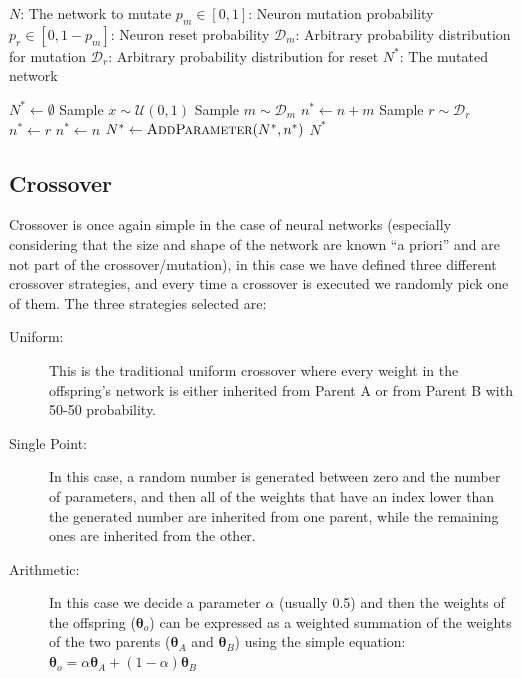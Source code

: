\begin{algorithm}[ht]
\caption{Mutation of neural network}
\begin{algorithmic}[1]
    \Require $N$: The network to mutate
    \Require $p_m \in [0, 1]$: Neuron mutation probability
    \Require $p_r \in [0, 1 - p_m]$: Neuron reset probability
    \Require $\mathcal{D}_m$: Arbitrary probability distribution for mutation 
    \Require $\mathcal{D}_r$: Arbitrary probability distribution for reset
    \Ensure $N^*$: The mutated network

        \State $N^* \gets \emptyset$ 
         
            \State Sample $x \sim \mathcal{U}(0,1)$
             
                \State Sample $m \sim \mathcal{D}_m$
                \State $n^* \gets n + m$
             
                \State Sample $r \sim \mathcal{D}_r$
                \State $n^* \gets r$
            \Else
                \State $n^* \gets n$
            \EndIf
            \State $N^* \gets \Call{AddParameter}{N^*, n^*}$ 
        \EndFor
        \State \Return $N^*$ 
    \EndProcedure
\end{algorithmic}
\label{alg:network_mut}
\end{algorithm}

\subsection{Crossover}
\label{sec:contact_points_grouping_cross}

Crossover is once again simple in the case of neural networks (especially
considering that the size and shape of the network are known ``a priori'' and are
not part of the crossover/mutation), in this case we have defined three different crossover
strategies, and every time a crossover is executed we randomly pick one of them.
The three strategies selected are:
\begin{description}
    \item [Uniform:] This is the traditional uniform crossover where every weight in the offspring's network
    is either inherited from Parent A or from Parent B with 50-50 probability.
    \item [Single Point:] In this case, a random number is generated between zero and the number of parameters,
    and then all of the weights that have an index lower than the generated number are inherited from one
    parent, while the remaining ones are inherited from the other.
    \item [Arithmetic:] In this case we decide a parameter $\alpha$ (usually 0.5) and then the weights of the
    offspring ($\boldsymbol{\theta}_{o}$) can be expressed as a weighted summation of the weights of the two parents
    ($\boldsymbol{\theta}_{A}$ and $\boldsymbol{\theta}_{B}$) using the simple equation: $\boldsymbol{\theta}_{o} = \alpha \boldsymbol{\theta}_{A} + (1 - \alpha)\boldsymbol{\theta}_{B}$
\end{description}

